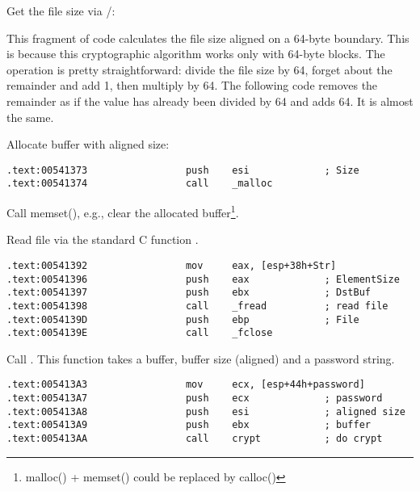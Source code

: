 Get the file size via /:



This fragment of code calculates the file size aligned on a 64-byte boundary. 
This is because this cryptographic algorithm works only with 64-byte blocks. 
The operation is pretty straightforward: divide the file size by 64, forget about the remainder and add 1, 
then multiply by 64. 
The following code removes the remainder as if the value has already been divided by 64 and adds 64. 
It is almost the same.



Allocate buffer with aligned size:

\begin{lstlisting}[style=customasmx86]
.text:00541373                 push    esi             ; Size
.text:00541374                 call    _malloc
\end{lstlisting}

Call memset(), e.g., clear the allocated buffer\footnote{malloc() + memset() could 
be replaced by calloc()}.



Read file via the standard C function .

\begin{lstlisting}[style=customasmx86]
.text:00541392                 mov     eax, [esp+38h+Str]
.text:00541396                 push    eax             ; ElementSize
.text:00541397                 push    ebx             ; DstBuf
.text:00541398                 call    _fread          ; read file
.text:0054139D                 push    ebp             ; File
.text:0054139E                 call    _fclose
\end{lstlisting}

Call . This function takes a buffer, buffer size (aligned) and a password string.

\begin{lstlisting}[style=customasmx86]
.text:005413A3                 mov     ecx, [esp+44h+password]
.text:005413A7                 push    ecx             ; password
.text:005413A8                 push    esi             ; aligned size
.text:005413A9                 push    ebx             ; buffer
.text:005413AA                 call    crypt           ; do crypt
\end{lstlisting}

